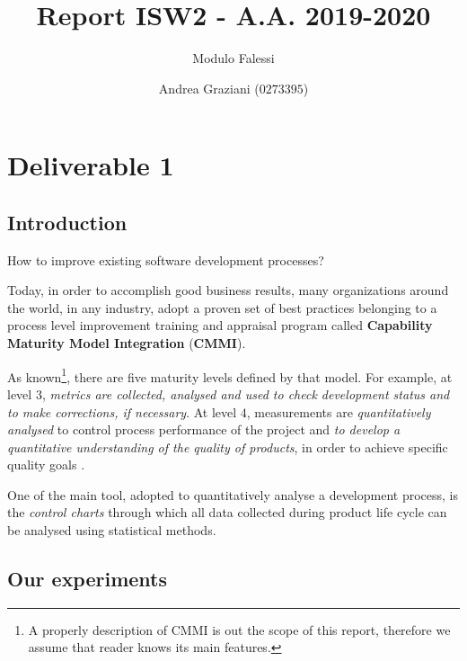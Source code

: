 \documentclass[sigconf]{acmart}
\begin{document}
\title{Report ISW2 - A.A. 2019-2020}
\subtitle{Modulo Falessi}

\author{Andrea Graziani ($0273395$)}

\maketitle
\section{Deliverable 1}

\subsection{Introduction}

How to improve existing software development processes?

Today, in order to accomplish good business results, many organizations around the world, in any industry, adopt a proven set of best practices belonging to a process level improvement training and appraisal program called \textbf{Capability Maturity Model Integration} (\textbf{CMMI})\cite{CMMIINSTITUTE}.

As known\footnote{A properly description of CMMI is out the scope of this report, therefore we assume that reader knows its main features.}, there are five maturity levels defined by that model. For example, at level $3$, \textit{metrics are collected, analysed and used to check development status and to make corrections, if necessary}. At level $4$, measurements are \textit{quantitatively analysed} to control process performance of the project and \textit{to develop a quantitative understanding of the quality of products}, in order to achieve specific quality goals \cite{FLORENCE}.

One of the main tool, adopted to quantitatively analyse a development process, is the \textit{control charts} 
through which all data collected during product life cycle can be analysed using statistical methods\cite{FLORENCE}.

\subsection{Our experiments}
\end{document}
